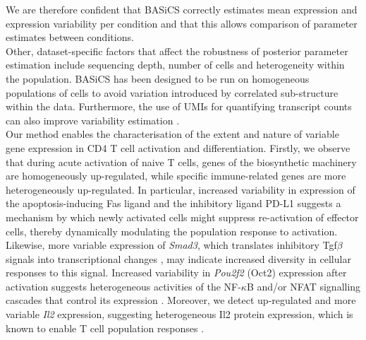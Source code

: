 \newpage

We are therefore confident that BASiCS correctly estimates mean expression and expression variability per condition and that this allows comparison of parameter estimates between conditions.\\

Other, dataset-specific factors that affect the robustness of posterior parameter estimation include sequencing depth, number of cells and heterogeneity within the population. 
BASiCS has been designed to be run on homogeneous populations of cells to avoid variation introduced by correlated sub-structure within the data. 
Furthermore, the use of UMIs for quantifying transcript counts can also improve variability estimation \citep{Grun2014}. \\

Our method enables the characterisation of the extent and nature of variable gene expression in CD4\plus{} T cell activation and differentiation. 
Firstly, we observe that during acute activation of naive T cells, genes of the biosynthetic machinery are homogeneously up-regulated, while specific immune-related genes are more heterogeneously up-regulated. In particular, increased variability in expression of the apoptosis-inducing Fas ligand \citep{Strasser2009} and the inhibitory ligand PD-L1 \citep{Chikuma2016} suggests a mechanism by which newly activated cells might suppress re-activation of effector cells, thereby dynamically modulating the population response to activation. 
Likewise, more variable expression of \emph{Smad3}, which translates inhibitory \gls{Tgf}$\beta$ signals into transcriptional changes \citep{Delisle2013}, may indicate increased diversity in cellular responses to this signal. 
Increased variability in \textit{Pou2f2} (Oct2) expression after activation suggests heterogeneous activities of the NF-$\kappa$B and/or \gls{NFAT} signalling cascades that control its expression \citep{Mueller2013}.
Moreover, we detect up-regulated and more variable \textit{Il2} expression, suggesting heterogeneous Il2 protein expression, which is known to enable T cell population responses \citep{Fuhrmann2016}. 

